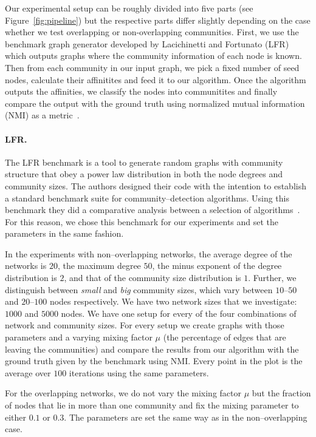 Our experimental setup can be roughly divided into five parts (see Figure~\ref{fig:pipeline}) but the 
respective parts differ slightly depending on the case whether we test overlapping or non-overlapping 
communities. First, we use the benchmark graph generator developed by Lacichinetti and Fortunato 
(LFR)~\cite{LFR08, LF09} which outputs graphs where the community information of each node 
is known. Then from each community in our input graph, we pick a fixed number of seed nodes, 
calculate their affinitites and feed it to our algorithm. Once the algorithm outputs the 
affinities, we classify the nodes into communitites and finally compare the output 
with the ground truth using normalized mutual information (NMI) as a metric~\cite{DDDA05}.


\paragraph{LFR.}
The LFR benchmark is a tool to generate random graphs with community structure that obey a power law distribution in both the node degrees and community sizes. The authors designed their code with the intention to establish a standard benchmark suite for community--detection algorithms. Using this benchmark they did a comparative analysis between a selection of algorithms~\cite{LF09}. For this reason, we chose this benchmark for our experiments and set the parameters in the same fashion. 

In the experiments with non--overlapping networks, the average degree of the networks is $20$, the maximum degree $50$, the minus exponent of the degree distribution is $2$, and that of the community size distribution is $1$. Further, we distinguish between \textit{small} and \textit{big} community sizes, which vary between $10$--$50$ and $20$--$100$ nodes respectively. We have two network sizes that we investigate: $1000$ and $5000$ nodes. We have one setup for every of the four combinations of network and community sizes. For every setup we create graphs with those parameters and a varying mixing factor $\mu$ (the percentage of edges that are leaving the communities) and compare the results from our algorithm with the ground truth given by the benchmark using NMI. Every point in the plot is the average over $100$ iterations using the same parameters.

For the overlapping networks, we do not vary the mixing factor $\mu$ but the fraction of nodes that lie in more than one community and fix the mixing parameter to either $0.1$ or $0.3$. The parameters are set the same way as in the non--overlapping case.


